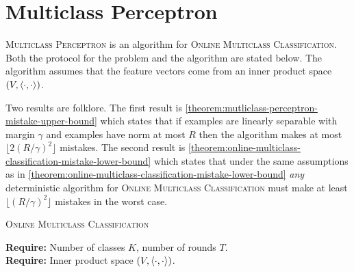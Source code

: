 \section{Multiclass Perceptron}
\label{section:multiclass-perceptron-proofs}

\textsc{Multiclass Perceptron} is an algorithm for \textsc{Online Multiclass
Classification}. Both the protocol for the problem and the algorithm are stated
below. The algorithm assumes that the feature vectors come from an inner product
space $(V, \left\langle \cdot, \cdot \right\rangle)$.

Two results are folklore. The first result is
\autoref{theorem:mutliclass-perceptron-mistake-upper-bound} which states that if
examples are linearly separable with margin $\gamma$ and examples have norm
at most $R$ then the algorithm makes at most $\lfloor 2 (R/\gamma)^2 \rfloor$
mistakes. The second result is
\autoref{theorem:online-multiclass-classification-mistake-lower-bound} which
states that under the same assumptions as in
\autoref{theorem:online-multiclass-classification-mistake-lower-bound}
\emph{any} deterministic algorithm for \textsc{Online Multiclass Classification}
must make at least $\lfloor (R/\gamma)^2 \rfloor$ mistakes in the worst case.

\begin{protocol}[h]
\caption{\textsc{Online Multiclass Classification}
\label{algorithm:mutliclass-classification}}
\textbf{Require:} Number of classes $K$, number of rounds $T$. \\
\textbf{Require:} Inner product space $(V,\left\langle \cdot, \cdot \right\rangle)$. \\
\end{protocol}

